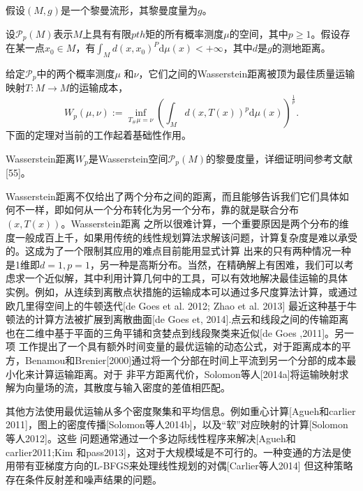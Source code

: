 假设$(M,g)$是一个黎曼流形，其黎曼度量为$g$。

\begin{definition}\label{def:wasserstein space}
    设$\mathcal{P}_p(M)$表示$M$上具有有限$pth$矩的所有概率测度$\mu$的空间，其中$p\ge 1$。假设存在某一点$x_0 \in M$，有$\int _{M} d(x,x_0)^P \mathrm{d}\mu(x) < + \infty$，其中$d$是$g$的测地距离。

    给定$\mathcal{P}_p$中的两个概率测度$\mu$ 和$\nu$，它们之间的Wasserstein距离被顶为最佳质量运输映射$T: M \to M$的运输成本，
    \begin{equation}\label{equation:wasserstein distance}
        W_p(\mu ,\nu ) := \inf _{T_\#\mu = \nu } \left( \int _M d(x,T(x))^p \mathrm{d}\mu (x) \right)^{\frac{1}{p}}. 
    \end{equation}
    下面的定理对当前的工作起着基础性作用。
\end{definition}
\begin{theorem}\label{theorem:Wassertein}
    Wasserstein距离$W_p$是Wasserstein空间$\mathcal{P}_p(M)$的黎曼度量，详细证明间参考文献[55]。
\end{theorem}

Wasserstein距离不仅给出了两个分布之间的距离，而且能够告诉我们它们具体如何不一样，即如何从一个分布转化为另一个分布，靠的就是联合分布 $(x,T(x))$。Wasserstein距离
之所以很难计算，一个重要原因是两个分布的维度一般成百上千，如果用传统的线性规划算法求解该问题，计算复杂度是难以承受的。这成为了一个限制其应用的难点目前能用显式计算
出来的只有两种情况一种是1维即$d=1,p=1$，另一种是高斯分布。当然，在精确解上有困难，我们可以考虑求一个近似解，其中利用计算几何中的工具，可以有效地解决最佳运输的具体
实例。例如，从连续到离散点状措施的运输成本可以通过多尺度算法计算\cite{merigot2011multiscale}，或通过欧几里得空间上的牛顿迭代[de Goes et al. 2012; Zhao et al. 2013]
最近这种基于牛顿法的计算方法被扩展到离散曲面[de Goes et, 2014].点云和线段之间的传输距离也在二维中基于平面的三角平铺和贪婪点到线段聚类来近似[de Goes ,2011]。另一项
工作提出了一个具有额外时间变量的最优运输的动态公式，对于距离成本的平方，Benamou和Brenier[2000]通过将一个分部在时间上平流到另一个分部的成本最小化来计算运输距离。对于
非平方距离代价，Solomon等人[2014a]将运输映射求解为向量场的流，其散度与输入密度的差值相匹配。

其他方法使用最优运输从多个密度聚集和平均信息。例如重心计算[Agueh和carlier 2011]，图上的密度传播[Solomon等人2014b]，以及“软”对应映射的计算[Solomon等人2012]。这些
问题通常通过一个多边际线性程序来解决[Agueh和carlier2011;Kim 和pass2013]，这对于大规模域是不可行的。一种变通的方法是使用带有亚梯度方向的L-BFGS来处理线性规划的对偶[Carlier等人2014]
但这种策略存在条件反射差和噪声结果的问题。


